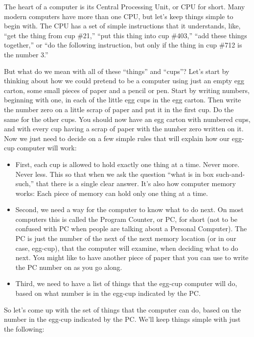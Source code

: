The heart of a computer is its Central Processing Unit, or CPU for short.  Many modern computers have more than one CPU, but let's keep
things simple to begin with.  The CPU has a set of simple instructions that it understands, like, ``get the thing from cup \#21,'' ``put this thing into cup \#403,'' ``add these things together,'' or ``do the following instruction, but only if the thing in cup \#712 is the number 3.''

But what do we mean with all of these ``things'' and ``cups''? Let's start by thinking about how we could pretend to be a computer using
just an empty egg carton, some small pieces of paper and a pencil or pen.  Start by writing numbers, beginning with one, in each of the
little egg cups in the egg carton.  Then write the number zero on a little scrap of paper and put it in the first cup.  Do the same for the other cups. You should now have an egg carton with numbered cups, and with every cup having a scrap of paper with the number zero written on it. Now we just need to decide on a few simple rules that will explain how our egg-cup computer will work:

\begin{itemize}
  \item First, each cup is allowed to hold exactly one thing at a time. Never more. Never less.  This so that when we ask the question ``what is in box such-and-such,'' that there is a single clear answer. It's also how computer memory works: Each piece of memory can hold only one thing at a time.

  \item Second, we need a way for the computer to know what to do next. On most computers this is called the Program Counter, or PC, for short (not to be confused with PC when people are talking about a Personal Computer).  The PC is just the number of the next of the next memory location (or in our case, egg-cup), that the computer will examine, when deciding what to do next.  You might like to have another piece of paper that you can use to write the PC number on as you go along.

  \item Third, we need to have a list of things that the egg-cup computer will do, based on what number is in the egg-cup indicated by the 
    PC.
\end{itemize}

So let's come up with the set of things that the computer can do, based on the number in the egg-cup indicated by the PC.  We'll keep things simple with just the following:


